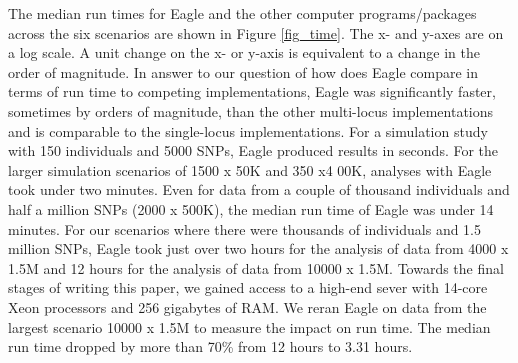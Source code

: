 \documentclass{nature}
\begin{document}
The median run times for Eagle and the other computer programs/packages across the six scenarios are shown in Figure \ref{fig_time}. 
The x- and y-axes are on a log scale.  A unit change on the x- or y-axis is equivalent to a change in the order of magnitude.  
In answer to our question of how does Eagle compare in terms of run time to competing implementations, 
Eagle was significantly faster, sometimes by orders of magnitude,  than the other multi-locus
 implementations and is comparable to the single-locus implementations. For a simulation study with 150 individuals and 
 5000 SNPs, Eagle produced results in seconds.  For the larger simulation scenarios of 1500 x  50K and 350 x4 00K, 
 analyses with Eagle took under two minutes. Even for data from a couple of thousand individuals and half a million 
 SNPs (2000 x 500K), the median run time of Eagle was under 14 minutes. For our scenarios where there 
 were thousands of individuals and 1.5 million SNPs, Eagle took just over two hours for the analysis of data from 
 4000 x 1.5M and  12 hours for the analysis of data from 10000 x 1.5M. 
 Towards the final stages of writing this paper, 
 we gained access to a high-end sever with 14-core Xeon processors and 256 gigabytes of RAM. We reran Eagle on data from the largest
  scenario 10000 x 1.5M to measure the impact on run time. The median run time dropped by more than 70\% 
  from 12 hours to 3.31 hours. 
 
\end{document}
